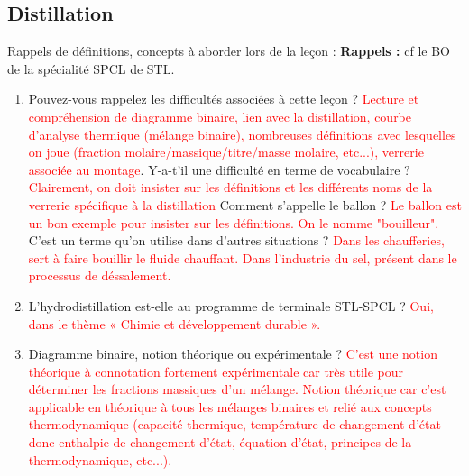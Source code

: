 \begin{headerBlock}
\chapter{Distillation}
    \label{LC_Distillation}
\end{headerBlock}






\begin{reportBlock}{Rappels de définitions, concepts à aborder lors de la leçon : }
\textbf{Rappels : } cf le BO de la spécialité SPCL de STL.

\begin{enumerate}
    \item Pouvez-vous rappelez les difficultés associées à cette leçon ? \textcolor{red}{Lecture et compréhension de diagramme binaire, lien avec la distillation, courbe d'analyse thermique (mélange binaire), nombreuses définitions avec lesquelles on joue (fraction molaire/massique/titre/masse molaire, etc...), verrerie associée au montage}. Y-a-t’il une difficulté en terme de vocabulaire ? \textcolor{red}{Clairement, on doit insister sur les définitions et les différents noms de la verrerie spécifique à la distillation} Comment s’appelle le ballon ? \textcolor{red}{Le ballon est un bon exemple pour insister sur les définitions. On le nomme "bouilleur".} C’est un terme qu’on utilise dans d’autres situations ? \textcolor{red}{Dans les chaufferies, sert à faire bouillir le fluide chauffant. Dans l'industrie du sel, présent dans le processus de déssalement.}
    \item L'hydrodistillation est-elle au programme de terminale STL-SPCL ? \textcolor{red}{Oui, dans le thème « Chimie et développement durable ».}
    \item Diagramme binaire, notion théorique ou expérimentale ? \textcolor{red}{C'est une notion théorique à connotation fortement expérimentale car très utile pour déterminer les fractions massiques d'un mélange. Notion théorique car c'est applicable en théorique à tous les mélanges binaires et relié aux concepts thermodynamique (capacité thermique, température de changement d'état donc enthalpie de changement d'état, équation d'état, principes de la thermodynamique, etc...).}
      
\end{enumerate}

\end{reportBlock}

